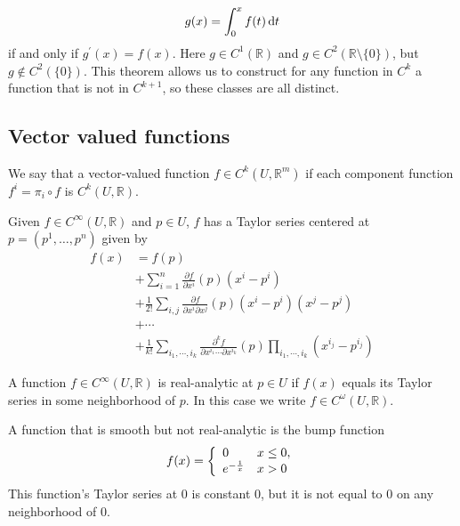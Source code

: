 \begin{theorem}
$$
g(x) = \int_0^x f(t) \mathop{}\!\mathrm{d} t
$$
if and only if $g^\prime(x) = f(x)$. Here $g \in C^1(\mathbb{R})$ and
$g \in C^2(\mathbb{R} \setminus \{ 0 \})$, but
$g \notin C^2(\{ 0 \})$. This theorem allows us to construct for any
function in $C^k$ a function that is not in $C^{k+1}$, so these
classes are all distinct.
\end{theorem}

\subsection{Vector valued functions}
We say that a vector-valued function
$f \in C^k(U, \mathbb{R}^m)$ if each component function
$f^i = \pi_i \circ f$ is $C^k(U, \mathbb{R})$.

Given $f \in C^\infty(U, \mathbb{R})$ and $p \in U$,
$f$ has a Taylor series centered at $p = (p^1, \dots, p^n)$ given by
\begin{align*}
  f(x)
&= f(p) \\
&+ \sum_{i=1}^n
    \frac{\partial f}
         {\partial x^i}(p)
    (x^i - p^i) \\
&+ \frac{1}{2!}
    \sum_{i,j}
      \frac{\partial f}
           {\partial x^i \partial x^j}(p)
      (x^i - p^i)
      (x^j - p^j) \\
&+  \cdots \\
&+  \frac{1}{k!}
    \sum_{i_1, \cdots, i_k}
      \frac{\partial^k f}
           {\partial x^{i_1} \cdots \partial x^{i_k}}(p)
      \prod_{i_1, \cdots, i_k} (x^{i_j} - p^{i_j})
\end{align*}

\begin{defn}
A function $f \in C^\infty (U, \mathbb{R})$ is real-analytic at $p \in
U$ if $f(x)$ equals its Taylor series in some neighborhood of $p$.
In this case we write $f \in C^\omega(U, \mathbb{R})$.
\end{defn}

\begin{xmpl}
A function that is smooth but not real-analytic is the bump function
$$
  f(x)
= \left\{
    \begin{array}{l l}
      0             & x \leq 0, \\
      e^{-\frac{1}{x}} & x > 0
    \end{array}
  \right.
$$
This function's Taylor series at 0 is constant 0, but it is not equal
to 0 on any neighborhood of 0.
\end{xmpl}

